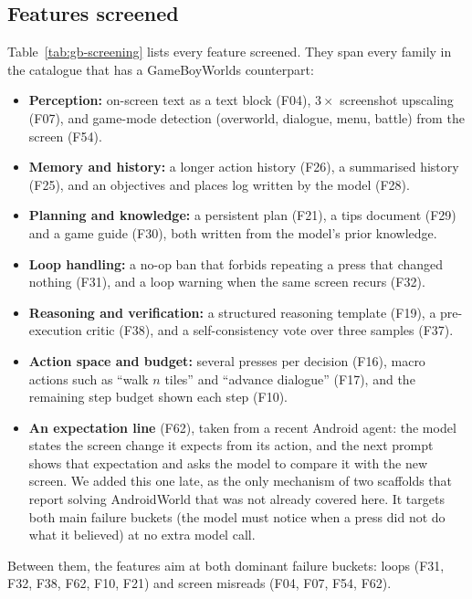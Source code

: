 \subsection{Features screened}

Table~\ref{tab:gb-screening} lists every feature screened. They span every family in the catalogue that has a
GameBoyWorlds counterpart:
\begin{itemize}
  \item \textbf{Perception:} on-screen text as a text block (F04), $3\times$ screenshot upscaling (F07), and game-mode
  detection (overworld, dialogue, menu, battle) from the screen (F54).
  \item \textbf{Memory and history:} a longer action history (F26), a summarised history (F25), and an objectives
  and places log written by the model (F28).
  \item \textbf{Planning and knowledge:} a persistent plan (F21), a tips document (F29) and a game guide (F30), both
  written from the model's prior knowledge.
  \item \textbf{Loop handling:} a no-op ban that forbids repeating a press that changed nothing (F31), and a loop
  warning when the same screen recurs (F32).
  \item \textbf{Reasoning and verification:} a structured reasoning template (F19), a pre-execution critic (F38),
  and a self-consistency vote over three samples (F37).
  \item \textbf{Action space and budget:} several presses per decision (F16), macro actions such as ``walk $n$
  tiles'' and ``advance dialogue'' (F17), and the remaining step budget shown each step (F10).
  \item \textbf{An expectation line} (F62), taken from a recent Android agent: the model states the screen change it
  expects from its action, and the next prompt shows that expectation and asks the model to compare it with the new
  screen. We added this one late, as the only mechanism of two scaffolds that report solving AndroidWorld that was
  not already covered here. It targets both main failure buckets (the model must notice when a press did not do what
  it believed) at no extra model call.
\end{itemize}
Between them, the features aim at both dominant failure buckets: loops (F31, F32, F38, F62, F10, F21) and screen
misreads (F04, F07, F54, F62).

